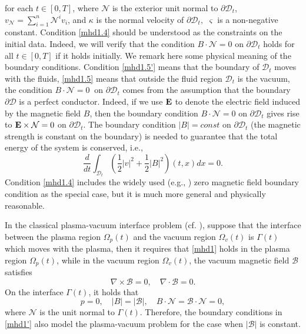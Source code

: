 \documentclass[12pt,reqno]{amsart}
\numberwithin{equation}{section}
\theoremstyle{definition}
\theoremstyle{remark}
\begin{document}
for each $t\in [0, T]$, where ${\mathcal{N}}$ is the exterior unit normal to ${\partial}{{\mathscr{D}_t}}$,  ${v}_{\mathcal{N}}=\sum_{i=1}^{n}{\mathcal{N}}^i v_i$, and $\kappa$ is the normal velocity of   ${\partial}{{\mathscr{D}}}_t,$  ${\varsigma}$ is a non-negative constant.
Condition \eqref{mhd1.4} should be understood as the constraints on the initial data. Indeed, we will verify that the condition ${B}\cdot {\mathcal{N}}=0$ on ${\partial}{{\mathscr{D}}}_t$
holds for all $t\in [0, T]$ if it holds initially.  We remark here some physical meaning of the boundary conditions. Condition \eqref{mhd1.5'} means that the boundary of ${{\mathscr{D}}}_t$
moves with the fluids, \eqref{mhd1.5} means that outside the fluid region ${{\mathscr{D}}}_t$ is the vacuum, the condition ${B}\cdot {\mathcal{N}}=0 \ \text{ on } {\partial}{{\mathscr{D}}}_t$ comes from the assumption
that the  boundary $\partial{{\mathscr{D}}}$ is a perfect conductor.  Indeed, if we use ${\bf E}$ to denote the electric field induced by the magnetic field $B$, then the boundary condition  ${B}\cdot {\mathcal{N}}=0$ on ${\partial}{{\mathscr{D}}}_t$ gives rise to ${\bf E}\times {\mathcal{N}}=0$ on ${\partial}{{\mathscr{D}}}_t$. The boundary condition $ |{B}|=const$ on ${\partial}{{\mathscr{D}}}_t$ (the magnetic strength is constant on the boundary) is needed to guarantee that the total energy of the system is conserved, i.e.,
$$\frac{d}{dt} \int_{{{\mathscr{D}}}_t}\left( \frac{1}{2}|v|^2+\frac{1}{2}|{B}|^2\right)(t,x)dx=0.$$
Condition \eqref{mhd1.4} includes the widely used (e.g., \cite{HW08}) zero magnetic field boundary condition as the special case, but it is much more general and physically
reasonable.

In the  classical plasma-vacuum interface problem (cf. \cite{GP,tr1}), suppose that the interface between the plasma
region $\Omega_{p}(t)$ and the vacuum region $\Omega_v(t)$ is $\Gamma(t)$ which moves with the plasma, then it requires that \eqref{mhd1} holds in the plasma region $\Omega_{p}(t)$, while in the vacuum region $\Omega_v(t)$, the vacuum magnetic field $\mathscr{B}$ satisfies
\begin{equation}\label{vacuum magnetic}
\nabla\times \mathscr{B}=0, \quad \nabla\cdot \mathscr{B}=0.
\end{equation}
On the interface $\Gamma(t)$, it holds that
\begin{equation}\label{interface}
p=0,\quad  |B|=|\mathscr{B}|,\quad  B\cdot {\mathcal{N}}=\mathscr{B}\cdot {\mathcal{N}}=0,
\end{equation}
where ${\mathcal{N}}$ is the unit normal to $\Gamma(t)$. Therefore, the boundary conditions in \eqref{mhd1'} also model the plasma-vacuum
problem for the case when $|\mathscr{B}|$ is constant.
\end{document}
